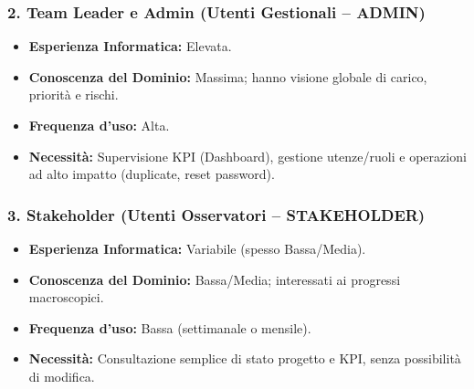 ﻿\documentclass[11pt,a4paper]{article}
\begin{document}
\subsubsection*{2. Team Leader e Admin (Utenti Gestionali -- ADMIN)}
\begin{itemize}
    \item \textbf{Esperienza Informatica:} Elevata.
    \item \textbf{Conoscenza del Dominio:} Massima; hanno visione globale di carico, priorità e rischi.
    \item \textbf{Frequenza d'uso:} Alta.
    \item \textbf{Necessità:} Supervisione KPI (Dashboard), gestione utenze/ruoli e operazioni ad alto impatto (duplicate, reset password).
\end{itemize}

\subsubsection*{3. Stakeholder (Utenti Osservatori -- STAKEHOLDER)}
\begin{itemize}
    \item \textbf{Esperienza Informatica:} Variabile (spesso Bassa/Media).
    \item \textbf{Conoscenza del Dominio:} Bassa/Media; interessati ai progressi macroscopici.
    \item \textbf{Frequenza d'uso:} Bassa (settimanale o mensile).
    \item \textbf{Necessità:} Consultazione semplice di stato progetto e KPI, senza possibilità di modifica.
\end{itemize}
\end{document}
